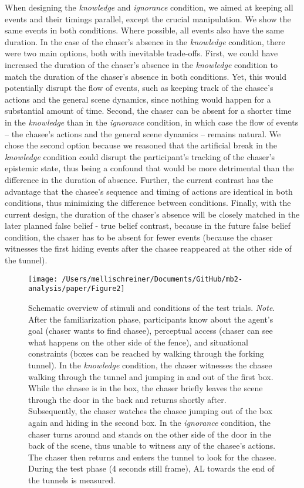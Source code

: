 \documentclass[
  english,
  man,floatsintext]{apa6}
\begin{document}
When designing the \emph{knowledge} and \emph{ignorance} condition, we aimed at keeping all events and their timings parallel, except the crucial manipulation. We show the same events in both conditions. Where possible, all events also have the same duration. In the case of the chaser's absence in the \emph{knowledge} condition, there were two main options, both with inevitable trade-offs. First, we could have increased the duration of the chaser's absence in the \emph{knowledge} condition to match the duration of the chaser's absence in both conditions. Yet, this would potentially disrupt the flow of events, such as keeping track of the chasee's actions and the general scene dynamics, since nothing would happen for a substantial amount of time. Second, the chaser can be absent for a shorter time in the \emph{knowledge} than in the \emph{ignorance} condition, in which case the flow of events -- the chasee's actions and the general scene dynamics -- remains natural. We chose the second option because we reasoned that the artificial break in the \emph{knowledge} condition could disrupt the participant's tracking of the chaser's epistemic state, thus being a confound that would be more detrimental than the difference in the duration of absence. Further, the current contrast has the advantage that the chasee's sequence and timing of actions are identical in both conditions, thus minimizing the difference between conditions. Finally, with the current design, the duration of the chaser's absence will be closely matched in the later planned false belief - true belief contrast, because in the future false belief condition, the chaser has to be absent for fewer events (because the chaser witnesses the first hiding events after the chasee reappeared at the other side of the tunnel).

\begin{figure}

{\centering \texttt{[image: /Users/mellischreiner/Documents/GitHub/mb2-analysis/paper/Figure2]} 

}

\caption{Schematic overview of stimuli and conditions of the test trials. \newline{} \textit{Note}. After the familiarization phase, participants know about the agent’s goal (chaser wants to find chasee), perceptual access (chaser can see what happens on the other side of the fence), and situational constraints (boxes can be reached by walking through the forking tunnel). In the \textit{knowledge} condition, the chaser witnesses the chasee walking through the tunnel and jumping in and out of the first box. While the chasee is in the box, the chaser briefly leaves the scene through the door in the back and returns shortly after. Subsequently, the chaser watches the chasee jumping out of the box again and hiding in the second box. In the \textit{ignorance} condition, the chaser turns around and stands on the other side of the door in the back of the scene, thus unable to witness any of the chasee’s actions. The chaser then returns and enters the tunnel to look for the chasee. During the test phase (4 seconds still frame), AL towards the end of the tunnels is measured.}\label{fig:fig2}
\end{figure}
\end{document}
